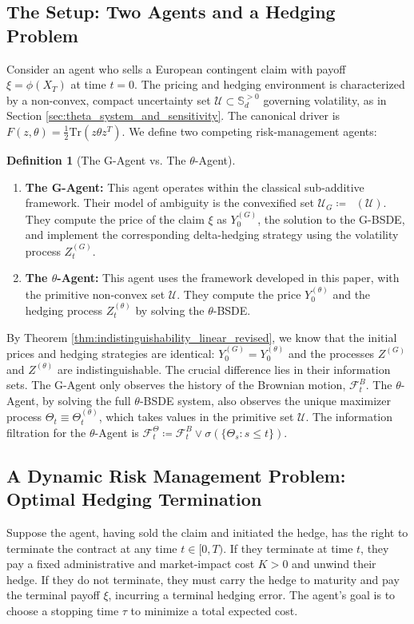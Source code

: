 \documentclass[12pt, letterpaper]{amsart}
\newcommand{\Ucal}{\mathcal{U}}
\newcommand{\Sdp}{\mathbb{S}_d^{>0}}
\newcommand{\Tr}{\mathrm{Tr}}
\DeclareMathOperator*{\overlineconv}{\overline{conv}}
\theoremstyle{plain}
\theoremstyle{definition}
\newtheorem{definition}[theorem]{Definition}
\theoremstyle{remark}
\numberwithin{equation}{section} %
\begin{document}
\subsection{The Setup: Two Agents and a Hedging Problem}
Consider an agent who sells a European contingent claim with payoff $\xi = \phi(X_T)$ at time $t=0$. The pricing and hedging environment is characterized by a non-convex, compact uncertainty set $\Ucal \subset \Sdp$ governing volatility, as in Section \ref{sec:theta_system_and_sensitivity}. The canonical driver is $F(z, \theta) = \frac{1}{2}\Tr(z\theta z^T)$. We define two competing risk-management agents:

\begin{definition}[The G-Agent vs. The $\theta$-Agent]
\begin{enumerate}
    \item \textbf{The G-Agent:} This agent operates within the classical sub-additive framework. Their model of ambiguity is the convexified set $\Ucal_G \coloneqq \overlineconv(\Ucal)$. They compute the price of the claim $\xi$ as $Y_0^{(G)}$, the solution to the G-BSDE, and implement the corresponding delta-hedging strategy using the volatility process $Z_t^{(G)}$.
    
    \item \textbf{The $\theta$-Agent:} This agent uses the framework developed in this paper, with the primitive non-convex set $\Ucal$. They compute the price $Y_0^{(\theta)}$ and the hedging process $Z_t^{(\theta)}$ by solving the $\theta$-BSDE.
\end{enumerate}
\end{definition}

By Theorem \ref{thm:indistinguishability_linear_revised}, we know that the initial prices and hedging strategies are identical: $Y_0^{(G)} = Y_0^{(\theta)}$ and the processes $Z^{(G)}$ and $Z^{(\theta)}$ are indistinguishable. The crucial difference lies in their information sets. The G-Agent only observes the history of the Brownian motion, $\mathcal{F}_t^B$. The $\theta$-Agent, by solving the full $\theta$-BSDE system, also observes the unique maximizer process $\Theta_t \equiv \Theta_t^{(\theta)}$, which takes values in the primitive set $\Ucal$. The information filtration for the $\theta$-Agent is $\mathcal{F}_t^\Theta \coloneqq \mathcal{F}_t^B \vee \sigma(\{\Theta_s : s \le t\})$.

\subsection{A Dynamic Risk Management Problem: Optimal Hedging Termination}
Suppose the agent, having sold the claim and initiated the hedge, has the right to terminate the contract at any time $t \in [0,T)$. If they terminate at time $t$, they pay a fixed administrative and market-impact cost $K > 0$ and unwind their hedge. If they do not terminate, they must carry the hedge to maturity and pay the terminal payoff $\xi$, incurring a terminal hedging error. The agent's goal is to choose a stopping time $\tau$ to minimize a total expected cost.
\end{document}
